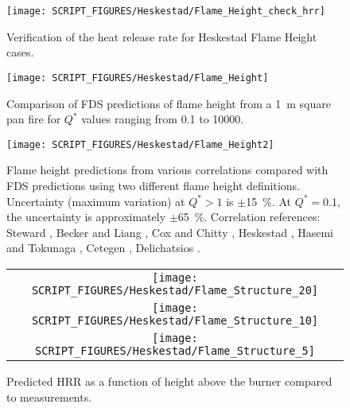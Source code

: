 \begin{figure}[!h]
\begin{center}
\texttt{[image: SCRIPT\_FIGURES/Heskestad/Flame\_Height\_check\_hrr]}
\end{center}
\caption[Verification of the heat release rate for Heskestad Flame Height cases]
{Verification of the heat release rate for Heskestad Flame Height cases.}
\label{Flame_Height_check_hrr}
\end{figure}

\clearpage

\begin{figure}[!h]
\begin{center}
\texttt{[image: SCRIPT\_FIGURES/Heskestad/Flame\_Height]}
\end{center}
\caption[Summary of flame height predictions, Heskestad correlation]
{Comparison of FDS predictions of flame height from a 1~m square pan fire for $Q^*$ values ranging from
0.1 to 10000.}
\label{Flame_Height}
\end{figure}

\begin{figure}[!h]
\begin{center}
\texttt{[image: SCRIPT\_FIGURES/Heskestad/Flame\_Height2]}
\end{center}
\caption[Flame height uncertainty, multiple correlations and flame height definitions]
{Flame height predictions from various correlations compared with FDS predictions using two different flame height definitions.  Uncertainty (maximum variation) at $Q^*>1$ is $\pm$15~\%.  At $Q^*=0.1$, the uncertainty is approximately $\pm$65~\%. Correlation references: Steward \cite{Steward:1970}, Becker and Liang \cite{Becker:1978}, Cox and Chitty \cite{Cox:1985}, Heskestad \cite{SFPE:Heskestad}, Hasemi and Tokunaga \cite{Hasemi:1984}, Cetegen \cite{Cetegen:1984}, Delichatsios \cite{Delichatsios:1984}.}
\label{Flame_Height2}
\end{figure}


\begin{figure}[p]
\begin{center}
\begin{tabular}{c}
\texttt{[image: SCRIPT\_FIGURES/Heskestad/Flame\_Structure\_20]} \\
\texttt{[image: SCRIPT\_FIGURES/Heskestad/Flame\_Structure\_10]} \\
\texttt{[image: SCRIPT\_FIGURES/Heskestad/Flame\_Structure\_5]}
\end{tabular}
\end{center}
\caption[Predicted HRR as a function of height above the burner]{Predicted HRR as a function of height above the burner compared to measurements.}
\label{Flame_Structure}
\end{figure}

